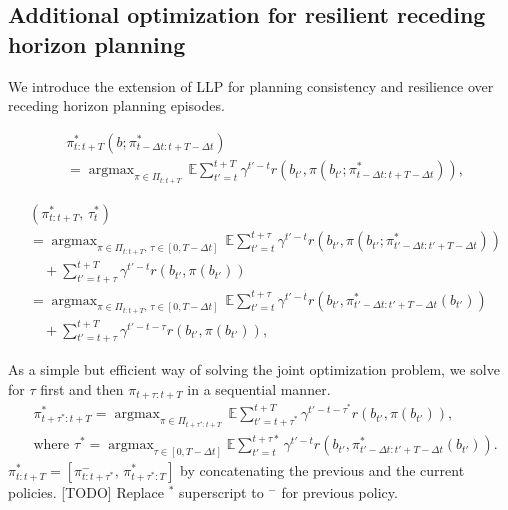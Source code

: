 \documentclass[letterpaper]{article} %
\newcommand{\argmax}{\mathop{\mathrm{argmax}}}
\begin{document}
\subsection{Additional optimization for resilient receding horizon planning} \label{ssec:resilient_rhp}
We introduce the extension of LLP for planning consistency and resilience over receding horizon planning episodes.

\begin{align}
  &\pi_{t:t+T}^*(b; \pi_{t-\Delta t:t+T-\Delta t}^*) 
  \nonumber \\
  &= \argmax_{\pi \in \Pi_{t:t+T}} \, \mathbb{E} \sum_{t'=t}^{t+T} \gamma^{t'-t} r(b_{t'}, \pi(b_{t'}; \pi_{t-\Delta t:t+T-\Delta t}^*)),
  \label{eq:revised_receding_objective_function}
\end{align}

\begin{align}
  &(\pi_{t:t+T}^*, \, \tau_t^*)
  \nonumber \\
  & = \argmax_{\pi \in \Pi_{t:t+T}, \, \tau \in [0, T-\Delta t]} \, \mathbb{E} \sum_{t'=t}^{t+\tau} \gamma^{t'-t} r(b_{t'}, \pi(b_{t'}; \pi_{{t'}-\Delta t:{t'}+T-\Delta t}^*))
  \nonumber \\
  &\quad + \sum_{t'=t+\tau}^{t+T} \gamma^{t'-t} r(b_{t'}, \pi(b_{t'}))
  \\
  & = \argmax_{\pi \in \Pi_{t:t+T}, \, \tau \in [0, T-\Delta t]} \, \mathbb{E} \sum_{t'=t}^{t+\tau} \gamma^{t'-t} r(b_{t'}, \pi_{{t'}-\Delta t:{t'}+T-\Delta t}^*(b_{t'}))
  \nonumber \\
  &\quad + \sum_{t'=t+\tau}^{t+T} \gamma^{t'-t-\tau} r(b_{t'}, \pi(b_{t'})),
\end{align}


As a simple but efficient way of solving the joint optimization problem, we solve for $\tau$ first and then $\pi_{t+\tau:t+T}$ in a sequential manner.
\begin{align}
  & \pi_{t+\tau^*:t+T}^* = \argmax_{\pi \in \Pi_{t+\tau^*:t+T}} \, \mathbb{E} \sum_{t'=t+\tau^*}^{t+T} \gamma^{t'-t-\tau^*} r(b_{t'}, \pi(b_{t'})),
  \nonumber \\
  &\text{where } \tau^* = \argmax_{\tau \in [0, T-\Delta t]} \mathbb{E} \sum_{t'=t}^{t+\tau*} \gamma^{t'-t} r(b_{t'}, \pi_{{t'}-\Delta t:{t'}+T-\Delta t}^*(b_{t'})).
  \label{eq:resilient_rhp}
\end{align}
$\pi_{t:t+T}^* = [\pi_{t:t+\tau^*}^-, \, \pi_{t+\tau^*:T}^*]$ by concatenating the previous and the current policies.
[TODO] Replace $^*$ superscript to $^-$ for previous policy.
\end{document}
